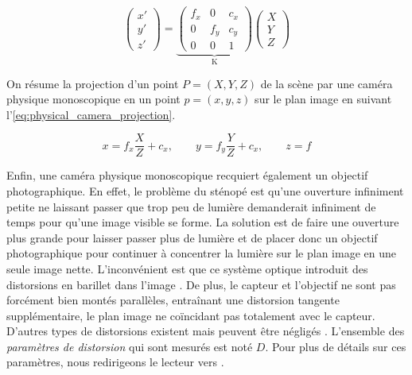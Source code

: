 \begin{equation}
  \label{eq:projection}
  \begin{pmatrix}
    x'\\
    y'\\
    z'
  \end{pmatrix}
  =
  \underbrace{
    \begin{pmatrix}
      f_x & 0 & c_x\\
      0 & f_y & c_y\\
      0 & 0 & 1
    \end{pmatrix}
  }_\text{K}
  \begin{pmatrix}
    X\\
    Y\\
    Z
  \end{pmatrix}
\end{equation}

On résume la projection d'un point $P=(X,Y,Z)$ de la scène par une caméra physique monoscopique en un point $p=(x,y,z)$ sur le plan image en suivant l'\autoref{eq:physical_camera_projection}.

\begin{equation}
  \label{eq:physical_camera_projection}
  x = f_x \frac{X}{Z} + c_x,\qquad y = f_y \frac{Y}{Z} + c_x,\qquad z = f
\end{equation}

Enfin, une caméra physique monoscopique recquiert également un objectif photographique. En effet, le problème du sténopé est qu'une ouverture infiniment petite ne laissant passer que trop peu de lumière demanderait infiniment de temps pour qu'une image visible se forme. La solution est de faire une ouverture plus grande pour laisser passer plus de lumière et de placer donc un objectif photographique pour continuer à concentrer la lumière sur le plan image en une seule image nette. L'inconvénient est que ce système optique introduit des distorsions en barillet dans l'image . De plus, le capteur et l'objectif ne sont pas forcément bien montés parallèles, entraînant une distorsion tangente supplémentaire, le plan image ne coïncidant pas totalement avec le capteur. D'autres types de distorsions existent mais peuvent être négligés \citep[p. 377]{Bradski2008}. L'ensemble des \emph{paramètres de distorsion} qui sont mesurés est noté $D$. Pour plus de détails sur ces paramètres, nous redirigeons le lecteur vers \cite[p. 375]{Bradski2008}.


